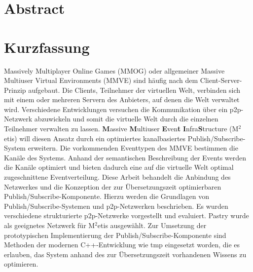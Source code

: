 \chapter*{Abstract}


\clearpage{\pagestyle{empty}\cleardoublepage}
\chapter*{Kurzfassung}

Massively Multiplayer Online Games (MMOG) oder allgemeiner Massive Multiuser Virtual Environments (MMVE) sind häufig nach dem Client-Server-Prinzip aufgebaut. Die Clients, Teilnehmer der virtuellen Welt, verbinden sich mit einem oder mehreren Servern des Anbieters, auf denen die Welt verwaltet wird. Verschiedene Entwicklungen versuchen die Kommunikation über ein p2p-Netzwerk abzuwickeln und somit die virtuelle Welt durch die einzelnen Teilnehmer verwalten zu lassen. \textbf{M}assive \textbf{M}ultiuser \textbf{E}ven\textbf{t} \textbf{I}nfra\textbf{S}tructure (M$^2$etis) will diesen Ansatz durch ein optimiertes kanalbasiertes Publish/Subscribe-System erweitern. Die vorkommenden Eventtypen des MMVE bestimmen die Kanäle des Systems. Anhand der semantischen Beschreibung der Events werden die Kanäle optimiert und bieten dadurch eine auf die virtuelle Welt optimal zugeschnittene Eventverteilung. Diese Arbeit behandelt die Anbindung des Netzwerkes und die Konzeption der zur Übersetzungszeit optimierbaren Publish/Subscribe-Komponente. Hierzu werden die Grundlagen von Publish/Subscribe-Systemen und p2p-Netzwerken beschrieben. Es wurden verschiedene strukturierte p2p-Netzwerke vorgestellt und evaluiert. Pastry wurde als geeignetes Netzwerk für M$^2$etis ausgewählt. Zur Umsetzung der prototypischen Implementierung der Publish/Subscribe-Komponente sind Methoden der modernen C++-Entwicklung wie \acf{tmp} eingesetzt worden, die es erlauben, das System anhand des zur Übersetzungszeit vorhandenen Wissens zu optimieren.

